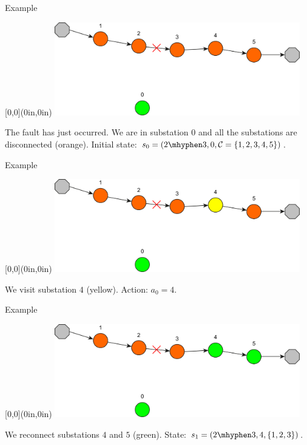 \documentclass[10pt, aspectratio=169, compress, protectframetitle, handout]{beamer}
\begin{document}
\begin{frame}{Example}

    \begin{textblock*}{\textwidth}[0,0](0in,0in)
        \centering
        \includegraphics[width=0.8\textwidth]{figures/MDP_0.pdf}
    \end{textblock*}
    
    \vspace*{5cm}
    The fault has just occurred. We are in substation $0$ and all the substations are disconnected (orange). Initial state: $s_0 = (2 \mhyphen 3, 0, \mathcal C = \{1,2,3,4,5\})$.
    
\end{frame}

\begin{frame}{Example}

    \begin{textblock*}{\textwidth}[0,0](0in,0in)
        \centering
        \includegraphics[width=0.8\textwidth]{figures/MDP_1.pdf}
    \end{textblock*}
    
    \vspace*{5cm}
    We visit substation $4$ (yellow). Action: $a_0 = 4$.
    
\end{frame}

\begin{frame}{Example}

    \begin{textblock*}{\textwidth}[0,0](0in,0in)
        \centering
        \includegraphics[width=0.8\textwidth]{figures/MDP_2.pdf}
    \end{textblock*}
    
    \vspace*{5cm}
    We reconnect substations $4$ and $5$ (green). State: $s_1 = (2 \mhyphen 3, 4, \{1,2,3\})$.
    
\end{frame}
\end{document}
